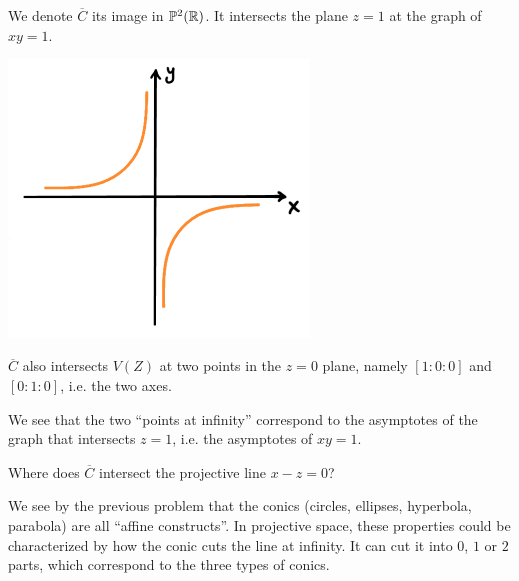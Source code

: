 We denote $\overline{C}$ its image in $\mathbb{P}^2(\mathbb{R})$. It intersects the plane $z=1$ at the graph of $xy=1$. 

\begin{center}
\includegraphics[width=8cm]{img/lecture_7/double_cone_2.png}    
\end{center}

$\overline{C}$ also intersects $V(Z)$ at two points in the $z=0$ plane, namely $[1:0:0]$ and $[0:1:0]$, i.e. the two axes. 


We see that the two ``points at infinity'' correspond to the asymptotes of the graph that intersects $z=1$, i.e. the asymptotes of $xy=1$. 

\begin{problem}
Where does $\overline{C}$ intersect the projective line $x-z=0$?

\begin{solution}

\end{solution}
\end{problem}

We see by the previous problem that the conics (circles, ellipses, hyperbola, parabola) are all ``affine constructs''. In projective space, these properties could be characterized by how the conic cuts the line at infinity. It can cut it into $0$, $1$ or $2$ parts, which correspond to the three types of conics. 